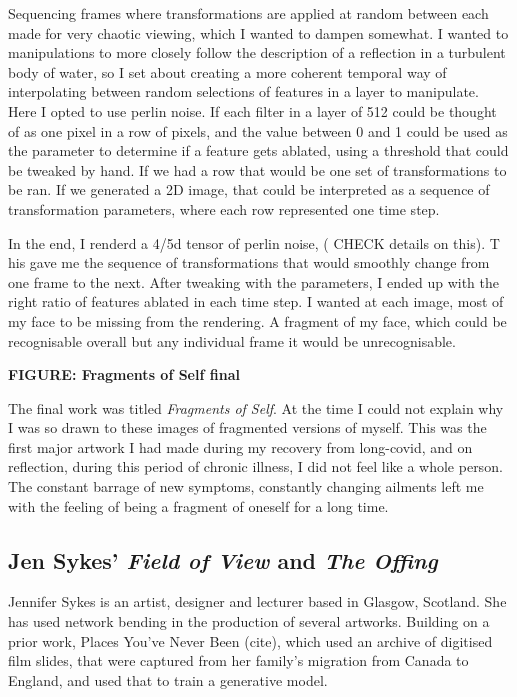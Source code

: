 Sequencing frames where transformations are applied at random between each made for very chaotic viewing, which I wanted to dampen somewhat. 
I wanted to manipulations to more closely follow the description of a reflection in a turbulent body of water, so I set about creating a more coherent temporal way of interpolating between random selections of features in a layer to manipulate. 
Here I opted to use perlin noise. If each filter in a layer of 512 could be thought of as one pixel in a row of pixels, and the value between 0 and 1 could be used as the parameter to determine if a feature gets ablated, using a threshold that could be tweaked by hand. 
If we had a row that would be one set of transformations to be ran. 
If we generated a 2D image, that could be interpreted as a sequence of transformation parameters, where each row represented one time step.

In the end, I renderd a 4/5d tensor of perlin noise, ( CHECK details on this). T
his gave me the sequence of transformations that would smoothly change from one frame to the next. 
After tweaking with the parameters, I ended up with the right ratio of features ablated in each time step. 
I wanted at each image, most of my face to be missing from the rendering. 
A fragment of my face, which could be recognisable overall but any individual frame it would be unrecognisable. 

\textbf{FIGURE: Fragments of Self final}

The final work was titled \textit{Fragments of Self}. 
At the time I could not explain why I was so drawn to these images of fragmented versions of myself. 
This was the first major artwork I had made during my recovery from long-covid, and on reflection, during this period of chronic illness, I did not feel like a whole person. 
The constant barrage of new symptoms, constantly changing ailments left me with the feeling of being a fragment of oneself for a long time.

\subsection{Jen Sykes' \textit{Field of View} and \textit{The Offing}}

Jennifer Sykes is an artist, designer and lecturer based in Glasgow, Scotland. 
She has used network bending in the production of several artworks. Building on a prior work, Places You’ve Never Been (cite), which used an archive of digitised film slides, that were captured from her family's migration from Canada to England, and used that to train a generative model. 

